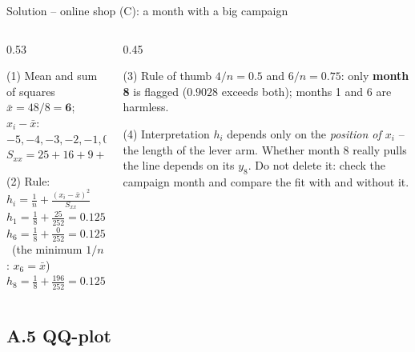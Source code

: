 \documentclass[aspectratio=169,11pt]{beamer}
\newcommand{\minlineskip}{%
  \setlength{\lineskiplimit}{2pt}\setlength{\lineskip}{2pt}%
  \setlength{\normallineskiplimit}{2pt}\setlength{\normallineskip}{2pt}}
\begin{document}
\begin{frame}{Solution -- online shop (C): a month with a big campaign}
  \begin{columns}[T]
    \begin{column}{0.53\textwidth}
      \small
      \begin{block}{(1) Mean and sum of squares}
        $\bar{x} = 48/8 = \mathbf{6}$; \ $x_i - \bar{x}$: $-5,-4,-3,-2,-1,0,1,14$\\[2pt]
        $S_{xx} = 25+16+9+4+1+0+1+196 = \mathbf{252}$
      \end{block}
      \begin{block}{(2) Rule: $h_i = \frac{1}{n} + \frac{(x_i-\bar{x})^{2}}{S_{xx}}$}
        \minlineskip
        $h_1 = \frac{1}{8} + \frac{25}{252} = 0.125 + 0.0992 = \mathbf{0.2242}$\\[3pt]
        $h_6 = \frac{1}{8} + \frac{0}{252} = \mathbf{0.125}$ \ (the minimum
        $1/n$: $x_6 = \bar{x}$)\\[3pt]
        $h_8 = \frac{1}{8} + \frac{196}{252} = 0.125 + 0.7778 = \mathbf{0.9028}$
      \end{block}
    \end{column}
    \begin{column}{0.45\textwidth}
      \small
      \begin{exampleblock}{(3) Rule of thumb}
        $4/n = 0.5$ and $6/n = 0.75$: only \textbf{month 8} is flagged
        ($0.9028$ exceeds both); months 1 and 6 are harmless.
      \end{exampleblock}
      \begin{alertblock}{(4) Interpretation}
        $h_i$ depends only on the \emph{position of $x_i$} -- the length of
        the lever arm. Whether month 8 really pulls the line depends on its
        $y_8$. Do not delete it: check the campaign month and compare the
        fit with and without it.
      \end{alertblock}
    \end{column}
  \end{columns}
\end{frame}

\subsection{A.5 QQ-plot}
\end{document}
